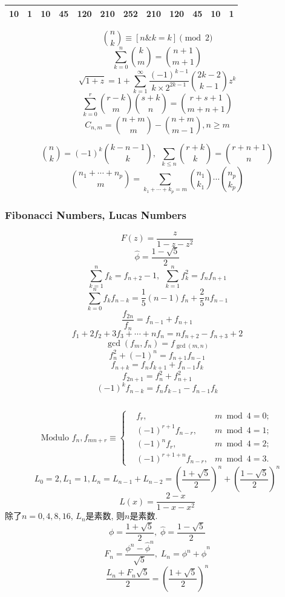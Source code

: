 \begin{footnotesize}
\begin{multicols*}{2}
\begin{scriptsize}
\begin{tabular}{|P{0.2cm}|P{0.3cm}|P{0.3cm}|P{0.3cm}|P{0.3cm}|P{0.3cm}|P{0.3cm}|P{0.3cm}|P{0.3cm}|P{0.3cm}|P{0.3cm}|P{0.3cm}|}
	10 & 1 & 10 & 45 & 120 & 210 & 252 & 210 & 120 & 45 & 10 & 1\\
	\hline
\end{tabular}
\end{scriptsize}
\[ {n \choose k} \equiv [n\& k=k] \pmod 2 \]
\[ \sum_{k=0}^n{k \choose m} = {n+1 \choose m+1} \]
\[ \sqrt{1+z} = 1 + \sum_{k=1}^{\infty}\frac{(-1)^{k-1}}{k\times2^{2k-1}}{2k-2 \choose k-1}z^k \]
\[ \sum_{k=0}^{r}{r-k \choose m}{s+k \choose n} = {r+s+1 \choose m+n+1} \]
\[ C_{n, m} = {n+m \choose m} - {n+m \choose m-1}, n \geq m \]
\end{multicols*}
\[ {n \choose k} = (-1)^k{k-n-1 \choose k},\ \ \sum_{k \leq n}{r+k \choose k} = {r+n+1 \choose n} \]
\[ {{n_1+\cdots+n_p}\choose m}=\sum_{k_1+\cdots+k_p=m}{n_1\choose k_1}\cdots{n_p\choose k_p}\]
\subsubsection{Fibonacci Numbers, Lucas Numbers}
\begin{multicols*}{2}
\[ F(z) = \frac{z}{1-z-z^2} \]
\[ \hat{\phi} = \frac{1-\sqrt{5}}{2} \]
\[ \sum_{k=1}^nf_k = f_{n+2}-1,\ \ \sum_{k=1}^nf^2_k = f_nf_{n+1} \]
\[ \sum_{k=0}^nf_kf_{n-k} = \frac{1}{5}(n-1)f_n+\frac{2}{5}nf_{n-1} \]
\[ \frac{f_{2n}}{f_n} = f_{n-1} + f_{n+1}\]
\[ f_1+2f_2+3f_3+\cdots+nf_n=nf_{n+2}-f_{n+3}+2\]
\[ \gcd(f_m,f_n)=f_{\gcd(m,n)}\]
\[ f^2_n + (-1)^n = f_{n+1}f_{n-1} \]
\[ f_{n+k} = f_nf_{k+1} + f_{n-1}f_k \]
\[ f_{2n+1} = f^2_n+f^2_{n+1} \]
\[ (-1)^kf_{n-k} = f_{n}f_{k-1} - f_{n-1}f_{k} \]
\begin{small}
\inputminted{python3}{sections/NumberTheory/assets/tbr/fib.py}
\end{small}
\end{multicols*}
\[ \text{Modulo }f_n, f_{mn+r} \equiv \left\{
\begin{aligned}
&f_r,& m \bmod 4 = 0; \\
&(-1)^{r+1}f_{n-r},& m \bmod 4 = 1; \\
&(-1)^nf_r,& m \bmod 4 = 2; \\
&(-1)^{r+1+n}f_{n-r},& m \bmod 4 = 3.
\end{aligned}
\right.
\]
\[ L_0=2,L_1=1,L_n=L_{n-1}+L_{n-2}=(\frac{1+\sqrt{5}}{2})^n+(\frac{1-\sqrt{5}}{2})^n \]
\[ L(x)=\frac{2-x}{1-x-x^2} \]
除了$n=0,4,8,16$, $L_n$是素数, 则$n$是素数.
$$\phi = \frac {1 + \sqrt 5} 2, \; \hat\phi = \frac {1 - \sqrt 5} 2$$
$$F_n = \frac {\phi^n - {\hat\phi} ^ n} {\sqrt 5}, \; L_n = \phi ^ n + {\hat\phi} ^ n$$
$$\frac {L_n + F_n \sqrt 5} 2 = \left( \frac {1 + \sqrt 5} 2 \right) ^ n$$


\end{footnotesize}
